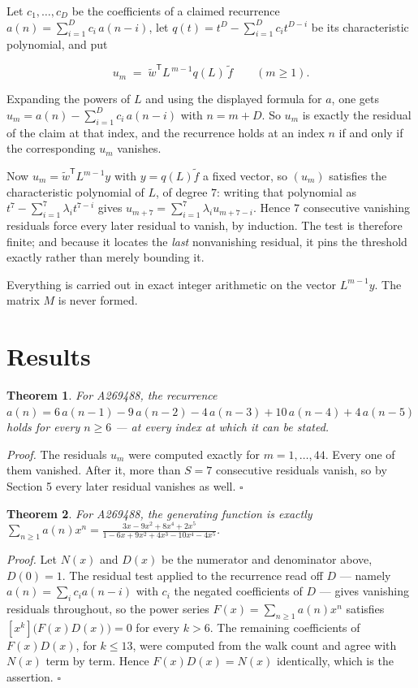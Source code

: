 \documentclass[11pt]{article}
\newtheorem{theorem}{Theorem}
\theoremstyle{definition}
\begin{document}
Let $c_1,\dots,c_D$ be the coefficients of a claimed recurrence $a(n) = \sum_{i=1}^{D} c_i\,a(n-i)$, let $q(t) = t^{D} - \sum_{i=1}^{D} c_i t^{D-i}$ be its characteristic polynomial, and put

\[u_m \;=\; \tilde w^{\mathsf T} L^{\,m-1} q(L)\,\tilde f \qquad (m \ge 1).\]

Expanding the powers of $L$ and using the displayed formula for $a$, one gets $u_m = a(n) - \sum_{i=1}^{D} c_i\,a(n-i)$ with $n = m + D$. So $u_m$ is exactly the residual of the claim at that index, and the recurrence holds at an index $n$ if and only if the corresponding $u_m$ vanishes.

Now $u_m = \tilde w^{\mathsf T} L^{m-1} y$ with $y = q(L)\tilde f$ a fixed vector, so $(u_m)$ satisfies the characteristic polynomial of $L$, of degree $7$: writing that polynomial as $t^{7} - \sum_{i=1}^{7} \lambda_i t^{7-i}$ gives $u_{m+7} = \sum_{i=1}^{7} \lambda_i u_{m+7-i}$. Hence $7$ consecutive vanishing residuals force every later residual to vanish, by induction. The test is therefore finite; and because it locates the {\itshape last} nonvanishing residual, it pins the threshold exactly rather than merely bounding it.

Everything is carried out in exact integer arithmetic on the vector $L^{m-1}y$. The matrix $M$ is never formed.

\section{Results}

\begin{theorem} For A269488, the recurrence $a(n) = 6\,a(n-1) - 9\,a(n-2) - 4\,a(n-3) + 10\,a(n-4) + 4\,a(n-5)$ holds for every $n \ge 6$ --- at every index at which it can be stated.\end{theorem}

{\itshape Proof.} The residuals $u_m$ were computed exactly for $m = 1,\dots,44$. Every one of them vanished. After it, more than $S = 7$ consecutive residuals vanish, so by Section 5 every later residual vanishes as well. $\square$

\begin{theorem} For A269488, the generating function is exactly $\sum_{n\ge 1} a(n)x^n = \frac{3x - 9x^{2} + 8x^{4} + 2x^{5}}{1 - 6x + 9x^{2} + 4x^{3} - 10x^{4} - 4x^{5}}$.\end{theorem}

{\itshape Proof.} Let $N(x)$ and $D(x)$ be the numerator and denominator above, $D(0)=1$. The residual test applied to the recurrence read off $D$ --- namely $a(n) = \sum_i c_i a(n-i)$ with $c_i$ the negated coefficients of $D$ --- gives vanishing residuals throughout, so the power series $F(x)=\sum_{n\ge 1}a(n)x^n$ satisfies $[x^k]\bigl(F(x)D(x)\bigr) = 0$ for every $k > 6$. The remaining coefficients of $F(x)D(x)$, for $k \le 13$, were computed from the walk count and agree with $N(x)$ term by term. Hence $F(x)D(x) = N(x)$ identically, which is the assertion. $\square$
\end{document}
